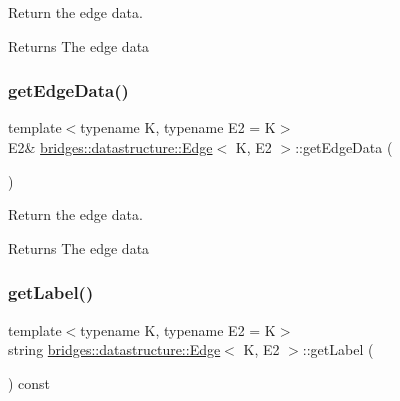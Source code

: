Return the edge data. 

\begin{DoxyReturn}{Returns}
The edge data 
\end{DoxyReturn}
\mbox{\label{classbridges_1_1datastructure_1_1_edge_a302b605a5d30387cfae8f4805c43ec41}} 
\subsubsection{\texorpdfstring{get\+Edge\+Data()}{getEdgeData()}\hspace{0.1cm}{\footnotesize\ttfamily [2/2]}}
{\footnotesize\ttfamily template$<$typename K, typename E2 = K$>$ \\
E2\& \hyperlink{classbridges_1_1datastructure_1_1_edge}{bridges\+::datastructure\+::\+Edge}$<$ K, E2 $>$\+::get\+Edge\+Data (\begin{DoxyParamCaption}{ }\end{DoxyParamCaption})\hspace{0.3cm}{\ttfamily [inline]}}



Return the edge data. 

\begin{DoxyReturn}{Returns}
The edge data 
\end{DoxyReturn}
\mbox{\label{classbridges_1_1datastructure_1_1_edge_aad4a9a28e282e5aa5e7821a14ef94327}} 
\subsubsection{\texorpdfstring{get\+Label()}{getLabel()}}
{\footnotesize\ttfamily template$<$typename K, typename E2 = K$>$ \\
string \hyperlink{classbridges_1_1datastructure_1_1_edge}{bridges\+::datastructure\+::\+Edge}$<$ K, E2 $>$\+::get\+Label (\begin{DoxyParamCaption}{ }\end{DoxyParamCaption}) const\hspace{0.3cm}{\ttfamily [inline]}}



